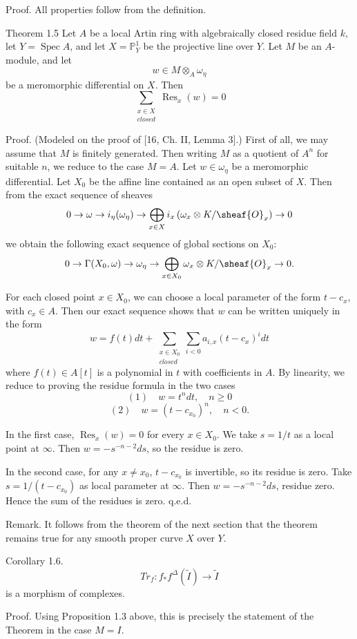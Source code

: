 \documentclass[12pt]{book}
\DeclareMathOperator{\Spec}{Spec}
\DeclareMathOperator{\Res}{Res}
\begin{document}
Proof. All properties follow from the definition.

\setcounter{page}{366}
Theorem 1.5
Let \(A\) be a local Artin ring with algebraically closed residue field \(k\), let \(Y=\Spec A\), and let \(X=\mathbb{P}_{Y}^{1}\) be the projective line over \(Y\).
Let \(M\) be an \(A\)-module, and let
\[w \in M \otimes_{A} \omega_{\eta}\]
be a meromorphic differential on \(X\).
Then
\[\sum_{\substack{x \in X \\ closed }} \Res_{x}(w)=0\]

Proof. (Modeled on the proof of [16, Ch. II, Lemma 3].)
First of all, we may assume that \(M\) is finitely generated.
Then writing \(M\) as a quotient of \(A^{n}\) for suitable \(n\), we reduce to the case \(M=A\).
Let \(w \in \omega_{\eta}\) be a meromorphic differential.
Let \(X_0\) be the affine line contained as an open subset of \(X\).
Then from the exact sequence of sheaves
\[0 \to \omega \to i_{\eta}(\omega_{\eta}) \to \bigoplus_{x \in X} i_{x}\left(\omega_{x} \otimes K / \sheaf{O}_{x}\right) \to 0\]
we obtain the following exact sequence of global sections on \(X_0\):
\[0 \to \Gamma(X_0,\omega) \to \omega_{\eta} \to \bigoplus_{x \in X_0} \omega_{x} \otimes K / \sheaf{O}_{x} \to 0 .\]

\setcounter{page}{367}
For each closed point \(x \in X_0\), we can choose a local parameter of the form \(t-c_{x}\), with \(c_{x} \in A\).
Then our exact sequence shows that \(w\) can be written uniquely in the form
\[w=f(t) dt+\sum_{\substack{x \in X_0 \\ closed }} \sum_{i<0} a_{i,x}\left(t-c_{x}\right)^{i} dt\]
where \(f(t) \in A[t]\) is a polynomial in \(t\) with coefficients in \(A\).
By linearity, we reduce to proving the residue formula in the two cases
\[(1)\quad w=t^{n} dt,\quad n \ge 0\]
\[(2)\quad w=\left(t-c_{x_0}\right)^{n},\quad n<0.\]

In the first case, \(\Res_{x}(w)=0\) for every \(x \in X_0\).
We take \(s=1/t\) as a local point at \(\infty\).
Then \(w=-s^{-n-2} ds\), so the residue is zero.

In the second case, for any \(x \ne x_0\), \(t-c_{x_0}\) is invertible, so its residue is zero.
Take \(s=1/(t-c_{x_0})\) as local parameter at \(\infty\).
Then \(w=-s^{-n-2} ds\), residue zero.
Hence the sum of the residues is zero. q.e.d.

\setcounter{page}{368}
Remark. It follows from the theorem of the next section that the theorem remains true for any smooth proper curve \(X\) over \(Y\).

Corollary 1.6.
\[Tr_{f}: f_{*} f^{\Delta}(\tilde{I}) \to \tilde{I}\]
is a morphism of complexes.

Proof. Using Proposition 1.3 above, this is precisely the statement of the Theorem in the case \(M = I\).
\end{document}
